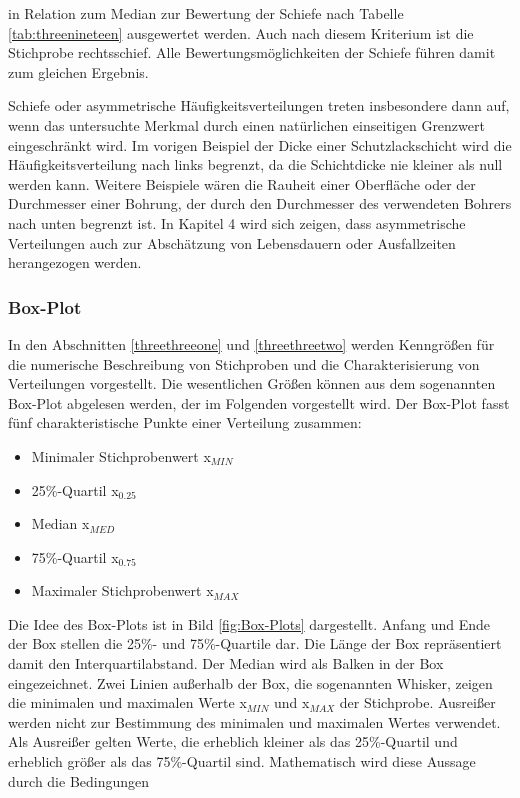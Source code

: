 \noindent in Relation zum Median zur Bewertung der Schiefe nach Tabelle \ref{tab:threenineteen} ausgewertet werden. Auch nach diesem Kriterium ist die Stichprobe rechtsschief. Alle Bewertungsm\"{o}glichkeiten der Schiefe f\"{u}hren damit zum gleichen Ergebnis.\newline

\noindent Schiefe oder asymmetrische H\"{a}ufigkeitsverteilungen treten insbesondere dann auf, wenn das untersuchte Merkmal durch einen nat\"{u}rlichen einseitigen Grenzwert eingeschr\"{a}nkt wird. Im vorigen Beispiel der Dicke einer Schutzlackschicht wird die H\"{a}ufigkeitsverteilung nach links begrenzt, da die Schichtdicke nie kleiner als null werden kann. Weitere Beispiele w\"{a}ren die Rauheit einer Oberfl\"{a}che oder der Durchmesser einer Bohrung, der durch den Durchmesser des verwendeten Bohrers nach unten begrenzt ist. In Kapitel 4 wird sich zeigen, dass asymmetrische Verteilungen auch zur Absch\"{a}tzung von Lebensdauern oder Ausfallzeiten herangezogen werden. 


\subsubsection{Box-Plot}

\noindent In den Abschnitten \ref{threethreeone} und \ref{threethreetwo} werden Kenngr\"{o}{\ss}en f\"{u}r die numerische Beschreibung von Stichproben und die Charakterisierung von Verteilungen vorgestellt. Die wesentlichen Gr\"{o}{\ss}en k\"{o}nnen aus dem sogenannten Box-Plot abgelesen werden, der im Folgenden vorgestellt wird. Der Box-Plot fasst f\"{u}nf charakteristische Punkte einer Verteilung zusammen:

\begin{itemize}
    \item Minimaler Stichprobenwert x$_{MIN}$
    \item 25\%-Quartil x$_{0.25}$
    \item Median x$_{MED}$
    \item 75\%-Quartil x$_{0.75}$
    \item Maximaler Stichprobenwert x$_{MAX}$
\end{itemize}

\noindent Die Idee des Box-Plots ist in Bild \ref{fig:Box-Plots} dargestellt. Anfang und Ende der Box stellen die 25\%- und 75\%-Quartile dar. Die L\"{a}nge der Box repr\"{a}sentiert damit den Interquartilabstand. Der Median wird als Balken in der Box eingezeichnet. Zwei Linien au{\ss}erhalb der Box, die sogenannten Whisker, zeigen die minimalen und maximalen Werte x${}_{MIN}$ und x${}_{MAX}$ der Stichprobe. Ausrei{\ss}er werden nicht zur Bestimmung des minimalen und maximalen Wertes verwendet. Als Ausrei{\ss}er gelten Werte, die erheblich kleiner als das 25\%-Quartil und erheblich gr\"{o}{\ss}er als das 75\%-Quartil sind. Mathematisch wird diese Aussage durch die Bedingungen 

